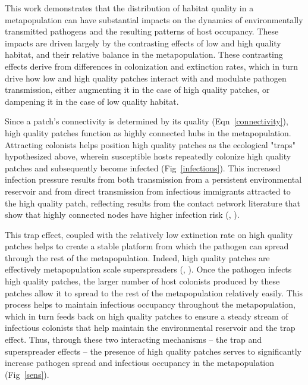 \documentclass{svjour3}
\begin{document}
This work demonstrates that the distribution of habitat quality in a metapopulation can have substantial impacts on the dynamics of environmentally transmitted pathogens and the resulting patterns of host occupancy.  These impacts are driven largely by the contrasting effects of low and high quality habitat, and their relative balance in the metapopulation.  These contrasting effects derive from differences in colonization and extinction rates, which in turn drive how low and high quality patches interact with and modulate pathogen transmission, either augmenting it in the case of high quality patches, or dampening it in the case of low quality habitat.   

Since a patch's connectivity is determined by its quality (Eqn~\ref{connectivity}), high quality patches function as highly connected hubs in the metapopulation.  Attracting colonists helps position high quality patches as the ecological "traps" hypothesized above, wherein susceptible hosts repeatedly colonize high quality patches and subsequently become infected (Fig~\ref{infections}).  This increased infection pressure results from both transmission from a persistent environmental reservoir and from direct transmission from infectious immigrants attracted to the high quality patch, reflecting results from the contact network literature that show that highly connected nodes have higher infection risk (\cite{Christley2005}, \cite{Keeling2005}).  

This trap effect, coupled with the relatively low extinction rate on high quality patches helps to create a stable platform from which the pathogen can spread through the rest of the metapopulation.  Indeed, high quality patches are effectively metapopulation scale superspreaders (\cite{Lloyd-Smith2005}, \cite{Paull2012}).  Once the pathogen infects high quality patches, the larger number of host colonists produced by these patches allow it to spread to the rest of the metapopulation relatively easily.  This process helps to maintain infectious occupancy throughout the metapopulation, which in turn feeds back on high quality patches to ensure a steady stream of infectious colonists that help maintain the environmental reservoir and the trap effect.  Thus, through these two interacting mechanisms -- the trap and superspreader effects -- the presence of high quality patches serves to significantly increase pathogen spread and infectious occupancy in the metapopulation (Fig~\ref{sens}).  
\end{document}
